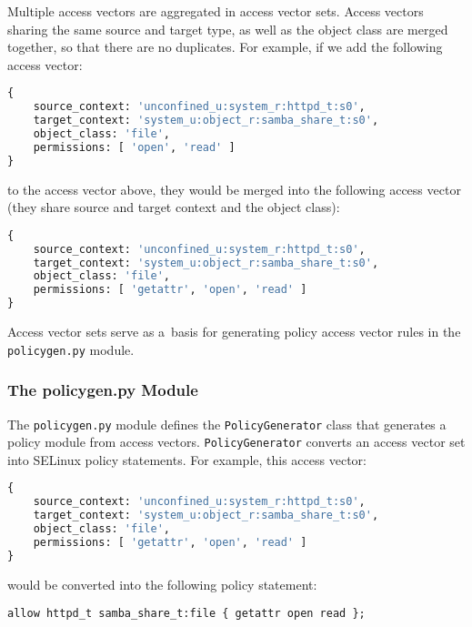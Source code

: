 Multiple access vectors are aggregated in access vector sets. Access vectors
sharing the same source and target type, as well as the object class are merged
together, so that there are no duplicates. For example, if we add the following
access vector:
\begin{lstlisting}[language=Python]
{
    source_context: 'unconfined_u:system_r:httpd_t:s0',
    target_context: 'system_u:object_r:samba_share_t:s0',
    object_class: 'file',
    permissions: [ 'open', 'read' ]
}
\end{lstlisting}
to the access vector above, they would be merged into the following access
vector (they share source and target context and the object class):
\begin{lstlisting}[language=Python]
{
    source_context: 'unconfined_u:system_r:httpd_t:s0',
    target_context: 'system_u:object_r:samba_share_t:s0',
    object_class: 'file',
    permissions: [ 'getattr', 'open', 'read' ]
}
\end{lstlisting}

Access vector sets serve as a~basis for generating policy access vector rules
in the \texttt{policygen.py} module.

\subsubsection{The policygen.py Module}
The \texttt{policygen.py} module defines the \texttt{PolicyGenerator} class that
generates a policy module from access vectors. \texttt{PolicyGenerator} converts
an access vector set into SELinux policy statements. For example, this access
vector:
\begin{lstlisting}[language=Python]
{
    source_context: 'unconfined_u:system_r:httpd_t:s0',
    target_context: 'system_u:object_r:samba_share_t:s0',
    object_class: 'file',
    permissions: [ 'getattr', 'open', 'read' ]
}
\end{lstlisting}
would be converted into the following policy statement:
\begin{lstlisting}
allow httpd_t samba_share_t:file { getattr open read };
\end{lstlisting}

